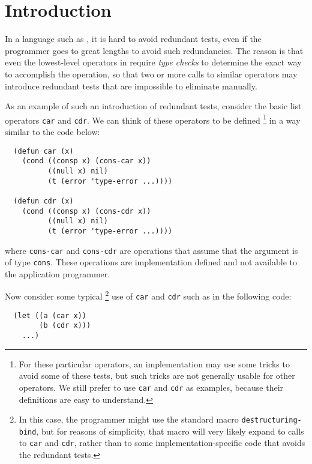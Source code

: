 \section{Introduction}

In a language such as \commonlisp{}, it is hard to avoid redundant
tests, even if the programmer goes to great lengths to avoid such
redundancies.  The reason is that even the lowest-level operators in
\commonlisp{} require \emph{type checks} to determine the exact way to
accomplish the operation, so that two or more calls to similar
operators may introduce redundant tests that are impossible to
eliminate manually.

As an example of such an introduction of redundant tests, consider the
basic list operators \texttt{car} and \texttt{cdr}.  We can think of
these operators to be defined%
\footnote{For these particular operators, an implementation may use
  some tricks to avoid some of these tests, but such tricks are not
  generally usable for other operators.  We still prefer to use
  \texttt{car} and \texttt{cdr} as examples, because their definitions
  are easy to understand.}
in a way similar to the code below:

\begin{verbatim}
  (defun car (x)
    (cond ((consp x) (cons-car x))
          ((null x) nil)
          (t (error 'type-error ...))))

  (defun cdr (x)
    (cond ((consp x) (cons-cdr x))
          ((null x) nil)
          (t (error 'type-error ...))))
\end{verbatim}

\noindent
where \texttt{cons-car} and \texttt{cons-cdr} are operations that
assume that the argument is of type \texttt{cons}.  These operations
are implementation defined and not available to the application
programmer.

Now consider some typical%
\footnote{In this case, the programmer might use the standard macro
  \texttt{destructuring-bind}, but for reasons of simplicity, that
  macro will very likely expand to calls to \texttt{car} and
  \texttt{cdr}, rather than to some implementation-specific code that
  avoids the redundant tests.}
use of \texttt{car} and \texttt{cdr} such as
in the following code:

\begin{verbatim}
  (let ((a (car x))
        (b (cdr x)))
    ...)
\end{verbatim}

